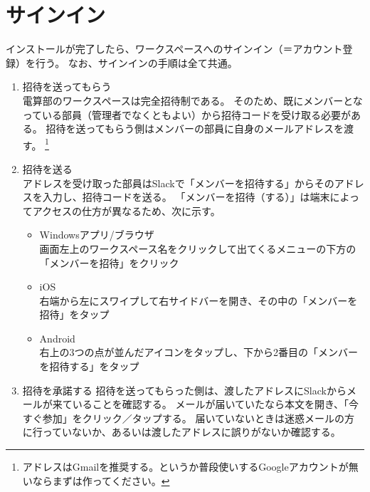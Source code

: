 \documentclass[lualatex,ja=standard,12pt,a4j]{bxjsbook}
\begin{document}
		\section{サインイン\label{signin}}
        	インストールが完了したら、ワークスペースへのサインイン（＝アカウント登録）を行う。
            なお、サインインの手順は全て共通。
            
            \begin{enumerate}
            	\item 招待を送ってもらう\\
                	電算部のワークスペースは完全招待制である。
                    そのため、既にメンバーとなっている部員（管理者でなくともよい）から招待コードを受け取る必要がある。
                    招待を送ってもらう側はメンバーの部員に自身のメールアドレスを渡す。
                    \footnote{アドレスはGmailを推奨する。というか普段使いするGoogleアカウントが無いならまずは作ってください。}
                \item 招待を送る\\
                	アドレスを受け取った部員はSlackで「メンバーを招待する」からそのアドレスを入力し、招待コードを送る。
                    「メンバーを招待（する）」は端末によってアクセスの仕方が異なるため、次に示す。
                    \begin{itemize}
                    	\item Windowsアプリ/ブラウザ\\
                        	画面左上のワークスペース名をクリックして出てくるメニューの下方の「メンバーを招待」をクリック
                        \item iOS\\
                        	右端から左にスワイプして右サイドバーを開き、その中の「メンバーを招待」をタップ
                        \item Android\\
                        	右上の3つの点が並んだアイコンをタップし、下から2番目の「メンバーを招待する」をタップ
                    \end{itemize}
                \item 招待を承諾する
                	招待を送ってもらった側は、渡したアドレスにSlackからメールが来ていることを確認する。
                    メールが届いていたなら本文を開き、「今すぐ参加」をクリック／タップする。
                    届いていないときは迷惑メールの方に行っていないか、あるいは渡したアドレスに誤りがないか確認する。
            \end{enumerate}
            
\end{document}

